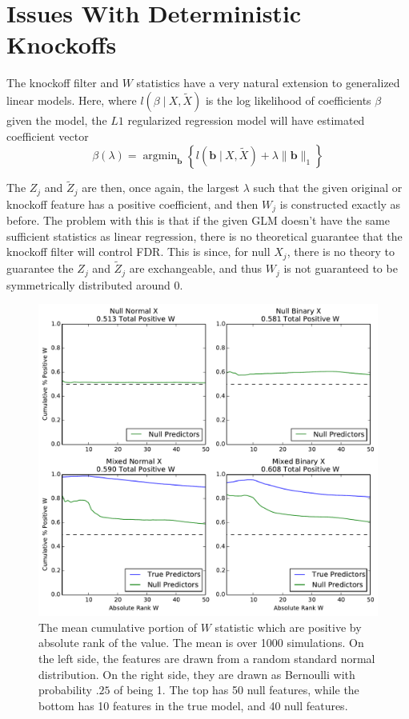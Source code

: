 \documentclass[11pt]{article}
\newcommand{\st}{ \; \big | \:}
\theoremstyle{definition}
\DeclareMathOperator*{\argmin}{arg\min}
\begin{document}
\section{Issues With Deterministic Knockoffs} 
    The knockoff filter and $W$ statistics have a very natural extension to generalized linear models. Here, where $l(\beta\st X, \tilde X)$ is the log likelihood of coefficients $\beta$ given the model, the $L1$ regularized regression model will have estimated coefficient vector
    \[ \beta(\lambda) = \argmin_\mathbf b \left\{l(\mathbf{b}\st X, \tilde X) + \lambda\|\mathbf{b}\|_1 \right\}\]

    The $Z_j$ and $\tilde Z_j$ are then, once again, the largest $\lambda$ such that the given original or knockoff feature has a positive coefficient, and then $W_j$ is constructed exactly as before. The problem with this is that if the given GLM doesn't have the same sufficient statistics as linear regression, there is no theoretical guarantee that the knockoff filter will control FDR. This is since, for null $X_j$, there is no theory to guarantee the $Z_j$ and $\tilde Z_j$ are exchangeable, and thus $W_j$ is not guaranteed to be symmetrically distributed around $0$. \par
    \begin{figure}[h]
        \begin{center}
        \includegraphics[width=14cm]{images/entryrate_original_logit}
    \end{center}
    \caption{\linespread{1}\selectfont{} The mean cumulative portion of $W$ statistic which are positive by absolute rank of the value. The mean is over 1000 simulations. On the left side, the features are drawn from a random standard normal distribution. On the right side, they are drawn as Bernoulli with probability $.25$ of being 1. The top has 50 null features, while the bottom has 10 features in the true model, and 40 null features.}
    \end{figure}
 
\end{document}
